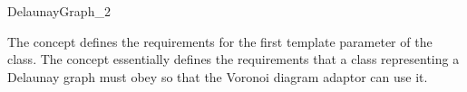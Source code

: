 

\begin{ccRefConcept}{DelaunayGraph_2}

\ccDefinition

The concept  defines the requirements for the
first template parameter of the 
class. The  concept essentially defines the
requirements that a class representing a Delaunay graph must obey so
that the Voronoi diagram adaptor can use it.

\ccRefines
{}\\
\\


\end{ccRefConcept}
